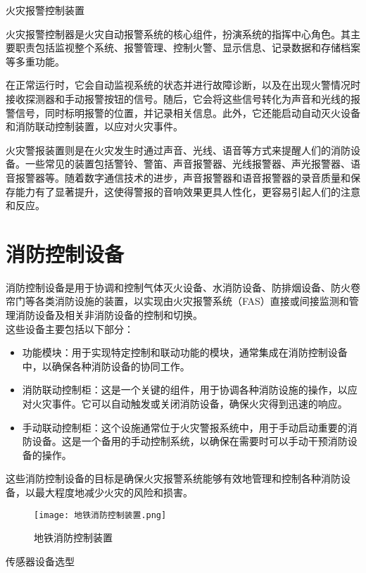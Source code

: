 火灾报警控制装置

火灾报警控制器是火灾自动报警系统的核心组件，扮演系统的指挥中心角色。其主要职责包括监视整个系统、报警管理、控制火警、显示信息、记录数据和存储档案等多重功能。\par 
在正常运行时，它会自动监视系统的状态并进行故障诊断，以及在出现火警情况时接收探测器和手动报警按钮的信号。随后，它会将这些信号转化为声音和光线的报警信号，同时标明报警的位置，并记录相关信息。此外，它还能启动自动灭火设备和消防联动控制装置，以应对火灾事件。\par 
火灾警报装置则是在火灾发生时通过声音、光线、语音等方式来提醒人们的消防设备。一些常见的装置包括警铃、警笛、声音报警器、光线报警器、声光报警器、语音报警器等。随着数字通信技术的进步，声音报警器和语音报警器的录音质量和保存能力有了显著提升，这使得警报的音响效果更具人性化，更容易引起人们的注意和反应。
\section{消防控制设备}
消防控制设备是用于协调和控制气体灭火设备、水消防设备、防排烟设备、防火卷帘门等各类消防设施的装置，以实现由火灾报警系统（FAS）直接或间接监测和管理消防设备及相关非消防设备的控制和切换。\\
这些设备主要包括以下部分：
\begin{itemize}
	\item 功能模块：用于实现特定控制和联动功能的模块，通常集成在消防控制设备中，以确保各种消防设备的协同工作。
	\item 消防联动控制柜：这是一个关键的组件，用于协调各种消防设施的操作，以应对火灾事件。它可以自动触发或关闭消防设备，确保火灾得到迅速的响应。
	\item 手动联动控制柜：这个设施通常位于火灾警报系统中，用于手动启动重要的消防设备。这是一个备用的手动控制系统，以确保在需要时可以手动干预消防设备的操作。
\end{itemize}
这些消防控制设备的目标是确保火灾报警系统能够有效地管理和控制各种消防设备，以最大程度地减少火灾的风险和损害。
\begin{figure}[!h]
	\centering
	\texttt{[image: 地铁消防控制装置.png]}
	\caption{地铁消防控制装置}
\end{figure}

传感器设备选型

